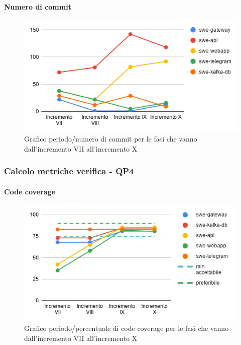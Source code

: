 \paragraph{Numero di commit}
\begin{figure}[H]
			\centering
			\includegraphics[width=0.8\linewidth]{./res/images/QM-PROC-10-NCOM.png}
			\caption{Grafico periodo/numero di commit per le fasi che vanno dall'incremento VII all'incremento X}
			\label{fig:Grafico periodo/numero di commit per le fasi che vanno dall'incremento VII all'incremento X}
	\end{figure}

\subsubsection{Calcolo metriche verifica - QP4}	
\paragraph{Code coverage}
\begin{figure}[H]
			\centering
			\includegraphics[width=0.8\linewidth]{./res/images/QM-TEST-1-COCO.png}
			\caption{Grafico periodo/percentuale di code coverage per le fasi che vanno dall'incremento VII all'incremento X}
			\label{fig:Grafico periodo/percentuale di code coverage per le fasi che vanno dall'incremento VII all'incremento X}
	\end{figure}
